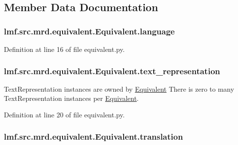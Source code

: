\subsection{Member Data Documentation}
\hypertarget{classlmf_1_1src_1_1mrd_1_1equivalent_1_1_equivalent_a72fc245f7193aba7f5c132eee799bcde}{
\subsubsection[{language}]{\setlength{\rightskip}{0pt plus 5cm}lmf.\+src.\+mrd.\+equivalent.\+Equivalent.\+language}}\label{classlmf_1_1src_1_1mrd_1_1equivalent_1_1_equivalent_a72fc245f7193aba7f5c132eee799bcde}


Definition at line 16 of file equivalent.\+py.

\hypertarget{classlmf_1_1src_1_1mrd_1_1equivalent_1_1_equivalent_a6912524a8f1ac4a8203f6fa386d2f5a1}{
\subsubsection[{text\+\_\+representation}]{\setlength{\rightskip}{0pt plus 5cm}lmf.\+src.\+mrd.\+equivalent.\+Equivalent.\+text\+\_\+representation}}\label{classlmf_1_1src_1_1mrd_1_1equivalent_1_1_equivalent_a6912524a8f1ac4a8203f6fa386d2f5a1}


Text\+Representation instances are owned by \hyperlink{classlmf_1_1src_1_1mrd_1_1equivalent_1_1_equivalent}{Equivalent} There is zero to many Text\+Representation instances per \hyperlink{classlmf_1_1src_1_1mrd_1_1equivalent_1_1_equivalent}{Equivalent}. 



Definition at line 20 of file equivalent.\+py.

\hypertarget{classlmf_1_1src_1_1mrd_1_1equivalent_1_1_equivalent_a77291abfc219bae6b51d8994d3c844a2}{
\subsubsection[{translation}]{\setlength{\rightskip}{0pt plus 5cm}lmf.\+src.\+mrd.\+equivalent.\+Equivalent.\+translation}}\label{classlmf_1_1src_1_1mrd_1_1equivalent_1_1_equivalent_a77291abfc219bae6b51d8994d3c844a2}


